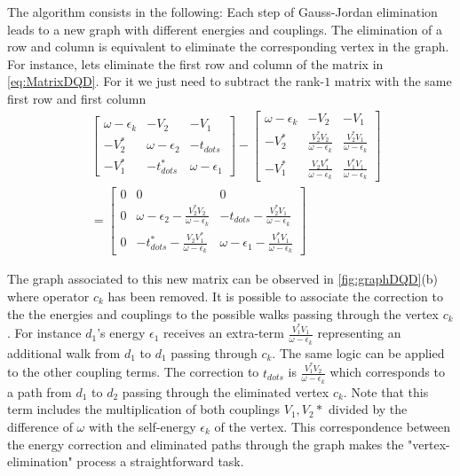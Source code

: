 The algorithm consists in the following: Each step of Gauss-Jordan elimination leads to a new graph with different energies and couplings. The elimination of a row and column is equivalent to eliminate the corresponding vertex in the graph. For instance, lets eliminate the first row and column of the matrix in \eqref{eq:MatrixDQD}. For it we just need to subtract the rank-$1$ matrix with the same first row and first column
\begin{align}
       & \left[\begin{array}{ccc}
    \omega-\epsilon_{k} & -V_{2} & -V_{1}\\
    -V_{2}^{*} & \omega-\epsilon_{2} & -t_{dots}\\
    -V_{1}^{*} & -t_{dots}^{*} & \omega-\epsilon_{1}
    \end{array}\right]-\left[\begin{array}{ccc}
    \omega-\epsilon_{k} & -V_{2} & -V_{1}\\
    -V_{2}^{*} & \frac{V_{2}^{*}V_{2}}{\omega-\epsilon_{k}} & \frac{V_{2}^{*}V_{1}}{\omega-\epsilon_{k}}\\
    -V_{1}^{*} & \frac{V_{2}V_{1}^{*}}{\omega-\epsilon_{k}} & \frac{V_{1}^{*}V_{1}}{\omega-\epsilon_{k}}
    \end{array}\right] \\ &= \left[\begin{array}{ccc}
    0 & 0 & 0\\
    0 & \omega-\epsilon_{2}-\frac{V_{2}^{*}V_{2}}{\omega-\epsilon_{k}} & -t_{dots}-\frac{V_{2}^{*}V_{1}}{\omega-\epsilon_{k}}\\
    0 & -t_{dots}^{*}-\frac{V_{2}V_{1}^{*}}{\omega-\epsilon_{k}} & \omega-\epsilon_{1}-\frac{V_{1}^{*}V_{1}}{\omega-\epsilon_{k}}
    \end{array}\right]
    \label{eq:Gauss-Jordan} 
\end{align}

The graph associated to this new matrix can be observed in \ref{fig:graphDQD}(b) where operator $c_k$ has been removed. It is possible to associate the correction to the the energies and couplings to the possible walks passing through the vertex $c_k$.  For instance $d_1$'s energy $\epsilon_1$ receives an extra-term $\frac{V_{1}^{*}V_{1}}{\omega-\epsilon_{k}}$ representing an additional walk  from $d_1$ to $d_1$ passing through  $c_k$. The same logic can be applied to the other coupling terms. The correction to $t_{dots}$ is $\frac{V_{1}^{*}V_{2}}{\omega-\epsilon_{k}}$ which corresponds to a path from $d_1$ to $d_2$ passing through the eliminated vertex $c_k$. Note that this term includes the multiplication of both couplings $V_1, V_2*$ divided by the difference of $\omega$ with the self-energy $\epsilon_k$ of the vertex. This correspondence between the energy correction and eliminated paths through the graph makes the "vertex-elimination" process a straightforward task. 

